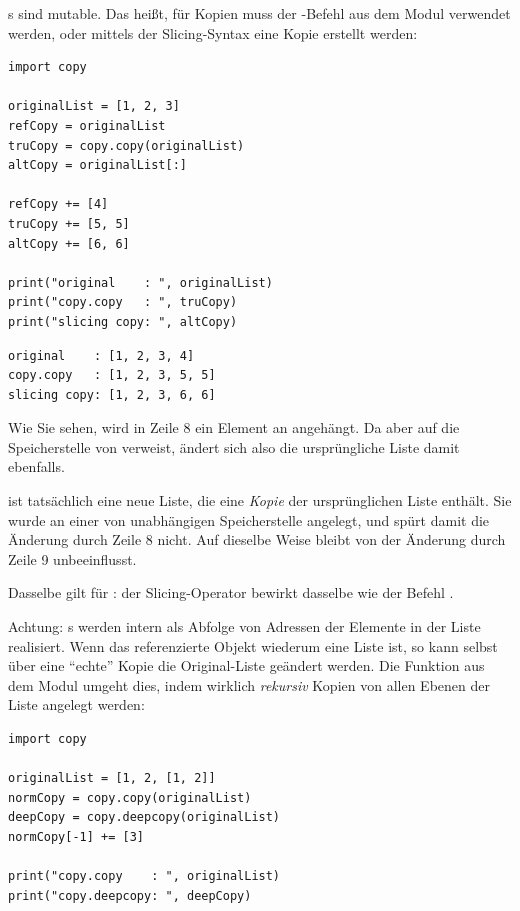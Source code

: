 s sind mutable. Das heißt, für Kopien muss der -Befehl aus dem Modul  verwendet werden, oder mittels der Slicing-Syntax eine Kopie erstellt werden:
\begin{codebox}
\begin{verbatim}
import copy

originalList = [1, 2, 3]
refCopy = originalList
truCopy = copy.copy(originalList)
altCopy = originalList[:]

refCopy += [4]
truCopy += [5, 5]
altCopy += [6, 6]

print("original    : ", originalList)
print("copy.copy   : ", truCopy)
print("slicing copy: ", altCopy)
\end{verbatim}
\end{codebox}

\begin{cmdbox}[Ausgabe]
\begin{verbatim}
original    : [1, 2, 3, 4]
copy.copy   : [1, 2, 3, 5, 5]
slicing copy: [1, 2, 3, 6, 6]
\end{verbatim}
\end{cmdbox}

Wie Sie sehen, wird in Zeile 8 ein Element an  angehängt. Da  aber auf die Speicherstelle von  verweist, ändert sich also die ursprüngliche Liste damit ebenfalls.

 ist tatsächlich eine neue Liste, die eine \emph{Kopie} der ursprünglichen Liste enthält. Sie wurde an einer von  unabhängigen Speicherstelle angelegt, und spürt damit die Änderung durch Zeile 8 nicht. Auf dieselbe Weise bleibt  von der Änderung durch Zeile 9 unbeeinflusst.

Dasselbe gilt für : der Slicing-Operator bewirkt dasselbe wie der Befehl .

Achtung: s werden intern als Abfolge von Adressen der Elemente in der Liste realisiert. Wenn das referenzierte Objekt wiederum eine Liste ist, so kann selbst über eine \enquote{echte} Kopie die Original-Liste geändert werden. Die Funktion  aus dem Modul  umgeht dies, indem wirklich \emph{rekursiv} Kopien von allen Ebenen der Liste angelegt werden:

\begin{codebox}
\begin{verbatim}
import copy

originalList = [1, 2, [1, 2]]
normCopy = copy.copy(originalList)
deepCopy = copy.deepcopy(originalList)
normCopy[-1] += [3]

print("copy.copy    : ", originalList)
print("copy.deepcopy: ", deepCopy)
\end{verbatim}
\end{codebox}

